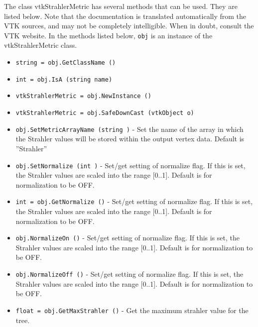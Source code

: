 The class vtkStrahlerMetric has several methods that can be used.
  They are listed below.
Note that the documentation is translated automatically from the VTK sources,
and may not be completely intelligible.  When in doubt, consult the VTK website.
In the methods listed below, \verb|obj| is an instance of the vtkStrahlerMetric class.
\begin{itemize}
\item  \verb|string = obj.GetClassName ()|

\item  \verb|int = obj.IsA (string name)|

\item  \verb|vtkStrahlerMetric = obj.NewInstance ()|

\item  \verb|vtkStrahlerMetric = obj.SafeDownCast (vtkObject o)|

\item  \verb|obj.SetMetricArrayName (string )| -  Set the name of the array in which the Strahler values will
 be stored within the output vertex data.
 Default is ''Strahler''

\item  \verb|obj.SetNormalize (int )| -  Set/get setting of normalize flag.  If this is set, the
 Strahler values are scaled into the range [0..1].
 Default is for normalization to be OFF.

\item  \verb|int = obj.GetNormalize ()| -  Set/get setting of normalize flag.  If this is set, the
 Strahler values are scaled into the range [0..1].
 Default is for normalization to be OFF.

\item  \verb|obj.NormalizeOn ()| -  Set/get setting of normalize flag.  If this is set, the
 Strahler values are scaled into the range [0..1].
 Default is for normalization to be OFF.

\item  \verb|obj.NormalizeOff ()| -  Set/get setting of normalize flag.  If this is set, the
 Strahler values are scaled into the range [0..1].
 Default is for normalization to be OFF.

\item  \verb|float = obj.GetMaxStrahler ()| -  Get the maximum strahler value for the tree.

\end{itemize}
